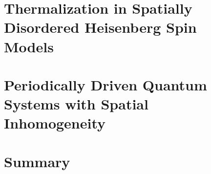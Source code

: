\documentclass[ twoside,openright,titlepage,numbers=noenddot,%
                headinclude,footinclude,cleardoublepage=empty,abstract=on,
                BCOR=5mm,paper=a4,fontsize=11pt]{scrreprt}
\begin{document}
\frenchspacing
\raggedbottom
{} %
\pagestyle{plain}



\cleardoublepage
\cleardoublepage
\cleardoublepage
\cleardoublepage

\cleardoublepage
\pagestyle{scrheadings}
\cleardoublepage



\part{Thermalization in Spatially Disordered Heisenberg Spin Models}\label{pt:spatial-disorder}









\part{Periodically Driven Quantum Systems with Spatial Inhomogeneity}\label{pt:floquet}







\part{Summary}


% 
\cleardoublepage
\cleardoublepage
\end{document}
